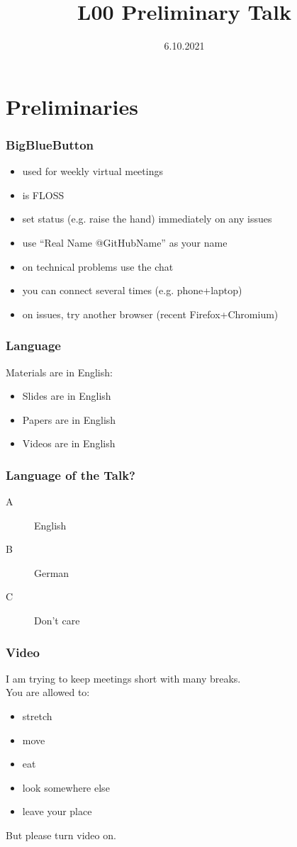 

\title{L00 Preliminary Talk}
\date{6.10.2021}


\section{Preliminaries}

\begin{frame}
	\frametitle{BigBlueButton}
	\begin{itemize}
		\item used for weekly virtual meetings
		\item is FLOSS
		\item set status (e.g. raise the hand) immediately on any issues
		\item use ``Real Name @GitHubName'' as your name
		\item on technical problems use the chat
		\item you can connect several times (e.g. phone+laptop)
		\item on issues, try another browser (recent Firefox+Chromium)
	\end{itemize}
\end{frame}

\begin{frame}
	\frametitle{Language}
	Materials are in English:
	\begin{itemize}
		\item Slides are in English
		\item Papers are in English
		\item Videos are in English
	\end{itemize}
\end{frame}

\begin{assignment}
	\frametitle{Language of the Talk?}
	\begin{task}
	\begin{description}
	\item[A] English
	\item[B] German
	\item[C] Don't care
	\end{description}
	\end{task}
\end{assignment}

\begin{assignment}
	\frametitle{Video}
	I am trying to keep meetings short with many breaks. \\
	You are allowed to:
	\begin{itemize}
		\item stretch
		\item move
		\item eat
		\item look somewhere else
		\item leave your place
	\end{itemize}
	\begin{task}
	But please turn video on.
	\end{task}
\end{assignment}

